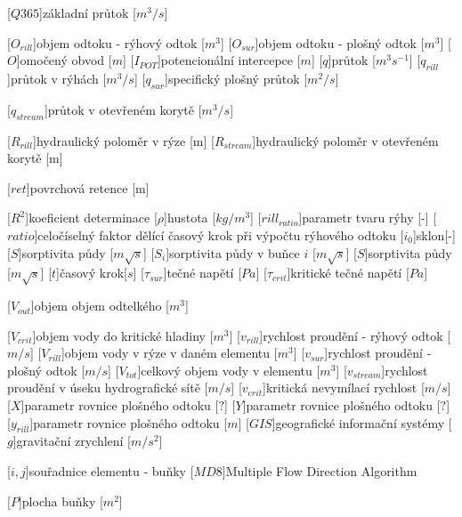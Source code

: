 \begin{acronym}
[$Q365$]{základní průtok [$m^3/s$]}

[$O_{rill}$]{objem odtoku - rýhový odtok [$m^{3}$]}
[$O_{sur}$]{objem odtoku - plošný odtok [$m^{3}$]}
[$O$]{omočený obvod [$m$]}
[$I_{POT}$]{potencionální intercepce [$m$]}
[$q$]{průtok [$m^{3}{s}^{-1}$]}
[$q_{rill}$]{průtok v rýhách [$m^{3}/s$]}
[$q_{sur}$]{specifický plošný průtok [$m^{2}/s$]}

[$q_{stream}$]{průtok v otevřeném korytě [$m^{3}/s$]}

[$R_{rill}$]{hydraulický poloměr v rýze [m]}
[$R_{stream}$]{hydraulický poloměr v otevřeném korytě [m]}

[$ret$]{povrchová retence [m]}

[$R^2$]{koeficient determinace}
[$\rho$]{hustota [$kg/m^{3}$]}
[$rill_{ratio}$]{parametr tvaru rýhy [-]}
[$ratio$]{celočíselný faktor dělící časový krok při výpočtu rýhového odtoku}
[$i_{0}$]{sklon[-]}
[$S$]{sorptivita půdy [$m \sqrt{s}$]}
[$S_{i}$]{sorptivita půdy  v buňce $i$  [$m \sqrt{s}$]}
[$S$]{sorptivita půdy [$m \sqrt{s}$]}
[$t$]{časový krok[$s$]}
[$\tau_{sur}$]{tečné napětí [$Pa$]}
[$\tau_{crit}$]{kritické tečné napětí [$Pa$]}

[$V_{out}$]{objem objem odtelkého [$m^{3}$]}

[$V_{crit}$]{objem vody do kritické hladiny [$m^{3}$]}
[$v_{rill}$]{rychlost proudění - rýhový odtok [$m/s$]}
[$V_{rill}$]{objem vody v rýze v daném elementu [$m^{3}$]}
[$v_{sur}$]{rychlost proudění - plošný odtok [$m/s$]}
[$V_{tot}$]{celkový objem vody v elementu [$m^{3}$]}
[$v_{stream}$]{rychlost proudění v úseku hydrografické sítě [$m/s$]}
[$v_{crit}$]{kritická nevymílací rychlost [$m/s$]}
[$X$]{parametr rovnice plošného odtoku [$?$]}
[$Y$]{parametr rovnice plošného odtoku [$?$]}
[$y_{rill}$]{parametr rovnice plošného odtoku [$m$]}
[$GIS$]{geografické informační systémy}
[$g$]{gravitační zrychlení [$m/s^{2}$]}

[$i, j$]{souřadnice elementu - buňky}
[$MD8$]{Multiple Flow Direction Algorithm}

[$P$]{plocha buňky [$m^2$]}



\end{acronym}
